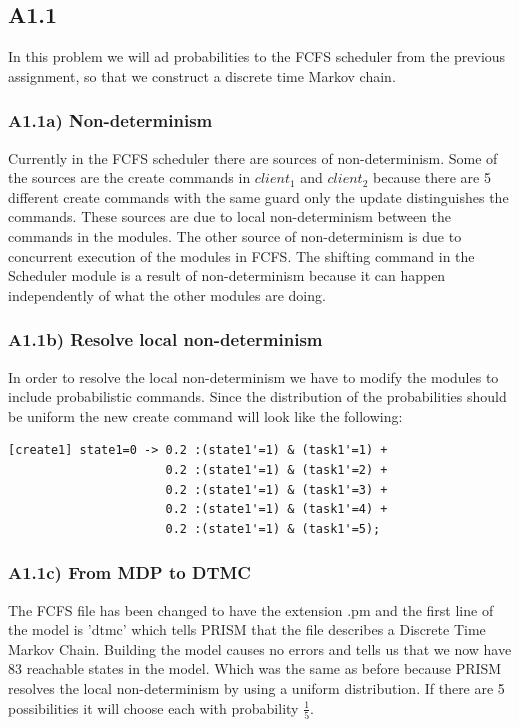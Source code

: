 \documentclass[12pt]{report}
\begin{document}
\subsection*{A1.1}
In this problem we will ad probabilities to the FCFS scheduler from the previous assignment, so that we construct a discrete time Markov chain.

\subsubsection*{A1.1a) Non-determinism}
Currently in the FCFS scheduler there are sources of non-determinism. Some of the sources are the create commands in $client_1$ and $client_2$ because there are 5 different create commands with the same guard only the update distinguishes the commands. These sources are due to local non-determinism between the commands in the modules. The other source of non-determinism is due to concurrent execution of the modules in FCFS. The shifting command in the Scheduler module is a result of non-determinism because it can happen independently of what the other modules are doing.

\subsubsection*{A1.1b) Resolve local non-determinism}
In order to resolve the local non-determinism we have to modify the modules to include probabilistic commands. Since the distribution of the probabilities should be uniform the new create command will look like the following:
\begin{lstlisting}[style=prismmodel, caption={The new create commands}]
[create1] state1=0 -> 0.2 :(state1'=1) & (task1'=1) +
                      0.2 :(state1'=1) & (task1'=2) +
                      0.2 :(state1'=1) & (task1'=3) +
                      0.2 :(state1'=1) & (task1'=4) + 
                      0.2 :(state1'=1) & (task1'=5);
\end{lstlisting}

\subsubsection*{A1.1c) From MDP to DTMC}
The FCFS file has been changed to have the extension .pm and the first line of the model is 'dtmc' which tells PRISM that the file describes a Discrete Time Markov Chain. Building the model causes no errors and tells us that we now have 83 reachable states in the model. Which was the same as before because PRISM resolves the local non-determinism by using a uniform distribution. If there are 5 possibilities it will choose each with probability $\frac{1}{5}$.
\end{document}
